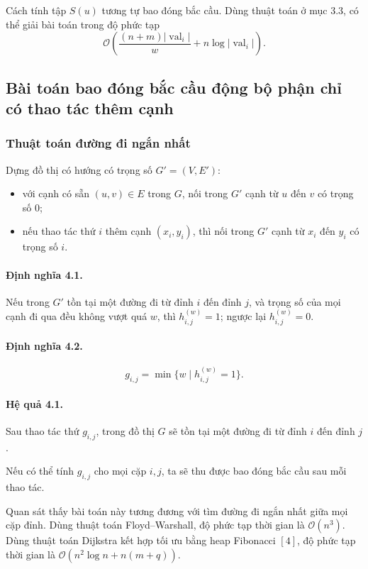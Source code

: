 \documentclass[11pt]{article}
\newcommand{\Oh}{\mathcal{O}}
\begin{document}
Cách tính tập \(S(u)\) tương tự bao đóng bắc cầu. Dùng thuật toán ở mục 3.3,
có thể giải bài toán trong độ phức tạp
\[
  \Oh\left(\frac{(n+m)|\operatorname{val}_i|}{w}
  + n\log |\operatorname{val}_i|\right).
\]

\subsection{Bài toán bao đóng bắc cầu động bộ phận chỉ có thao tác thêm cạnh}

\subsubsection{Thuật toán đường đi ngắn nhất}

Dựng đồ thị có hướng có trọng số \(G'=(V,E')\):
\begin{itemize}
  \item với cạnh có sẵn \((u,v)\in E\) trong \(G\), nối trong \(G'\) cạnh từ
  \(u\) đến \(v\) có trọng số \(0\);

  \item nếu thao tác thứ \(i\) thêm cạnh \((x_i,y_i)\), thì nối trong \(G'\)
  cạnh từ \(x_i\) đến \(y_i\) có trọng số \(i\).
\end{itemize}

\paragraph{Định nghĩa 4.1.}
Nếu trong \(G'\) tồn tại một đường đi từ đỉnh \(i\) đến đỉnh \(j\), và trọng số
của mọi cạnh đi qua đều không vượt quá \(w\), thì \(h_{i,j}^{(w)}=1\); ngược
lại \(h_{i,j}^{(w)}=0\).

\paragraph{Định nghĩa 4.2.}
\[
  g_{i,j}=\min\{w\mid h_{i,j}^{(w)}=1\}.
\]

\paragraph{Hệ quả 4.1.}
Sau thao tác thứ \(g_{i,j}\), trong đồ thị \(G\) sẽ tồn tại một đường đi từ
đỉnh \(i\) đến đỉnh \(j\).

Nếu có thể tính \(g_{i,j}\) cho mọi cặp \(i,j\), ta sẽ thu được bao đóng bắc
cầu sau mỗi thao tác.

Quan sát thấy bài toán này tương đương với tìm đường đi ngắn nhất giữa mọi cặp
đỉnh. Dùng thuật toán Floyd--Warshall, độ phức tạp thời gian là \(\Oh(n^3)\).
Dùng thuật toán Dijkstra kết hợp tối ưu bằng heap Fibonacci \([4]\), độ phức
tạp thời gian là \(\Oh(n^2\log n+n(m+q))\).
\end{document}
